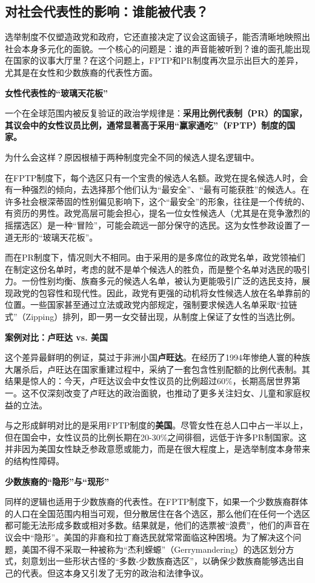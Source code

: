 \subsection{对社会代表性的影响：谁能被代表？}

选举制度不仅塑造政党和政府，它还直接决定了议会这面镜子，能否清晰地映照出社会本身多元化的面貌。一个核心的问题是：谁的声音能被听到？谁的面孔能出现在国家的议事大厅里？在这个问题上，FPTP和PR制度再次显示出巨大的差异，尤其是在女性和少数族裔的代表性方面。

\textbf{女性代表性的“玻璃天花板”}

一个在全球范围内被反复验证的政治学规律是：\textbf{采用比例代表制（PR）的国家，其议会中的女性议员比例，通常显著高于采用“赢家通吃”（FPTP）制度的国家。}

为什么会这样？原因根植于两种制度完全不同的候选人提名逻辑中。

在FPTP制度下，每个选区只有一个宝贵的候选人名额。政党在提名候选人时，会有一种强烈的倾向，去选择那个他们认为“最安全”、“最有可能获胜”的候选人。在许多社会根深蒂固的性别偏见影响下，这个“最安全”的形象，往往是一个传统的、有资历的男性。政党高层可能会担心，提名一位女性候选人（尤其是在竞争激烈的摇摆选区）是一种“冒险”，可能会疏远一部分保守的选民。这为女性参政设置了一道无形的“玻璃天花板”。

而在PR制度下，情况则大不相同。由于采用的是多席位的政党名单，政党领袖们在制定这份名单时，考虑的就不是单个候选人的胜负，而是整个名单对选民的吸引力。一份性别均衡、族裔多元的候选人名单，被认为更能吸引广泛的选民支持，展现政党的包容性和现代性。因此，政党有更强的动机将女性候选人放在名单靠前的位置。一些国家甚至通过立法或政党内部规定，强制要求候选人名单采取“拉链式”（Zipping）排列，即一男一女交替出现，从制度上保证了女性的当选比例。

\textbf{案例对比：卢旺达 vs. 美国}

这个差异最鲜明的例证，莫过于非洲小国\textbf{卢旺达}。在经历了1994年惨绝人寰的种族大屠杀后，卢旺达在国家重建过程中，采纳了一套包含性别配额的比例代表制。其结果是惊人的：今天，卢旺达议会中女性议员的比例超过60\%，长期高居世界第一。这不仅深刻改变了卢旺达的政治面貌，也推动了更多关注妇女、儿童和家庭权益的立法。

与之形成鲜明对比的是采用FPTP制度的\textbf{美国}。尽管女性在总人口中占一半以上，但在国会中，女性议员的比例长期在20-30\%之间徘徊，远低于许多PR制国家。这并非因为美国女性缺乏参政意愿或能力，而是在很大程度上，是选举制度本身带来的结构性障碍。

\textbf{少数族裔的“隐形”与“现形”}

同样的逻辑也适用于少数族裔的代表性。在FPTP制度下，如果一个少数族裔群体的人口在全国范围内相当可观，但分散居住在各个选区，那么他们在任何一个选区都可能无法形成多数或相对多数。结果就是，他们的选票被“浪费”，他们的声音在议会中“隐形”。美国的非裔和拉丁裔选民就常常面临这种困境。为了解决这个问题，美国不得不采取一种被称为“杰利蝾螈”（Gerrymandering）的选区划分方式，刻意划出一些形状古怪的“多数-少数族裔选区”，以确保少数族裔能够选出自己的代表。但这本身又引发了无穷的政治和法律争议。

